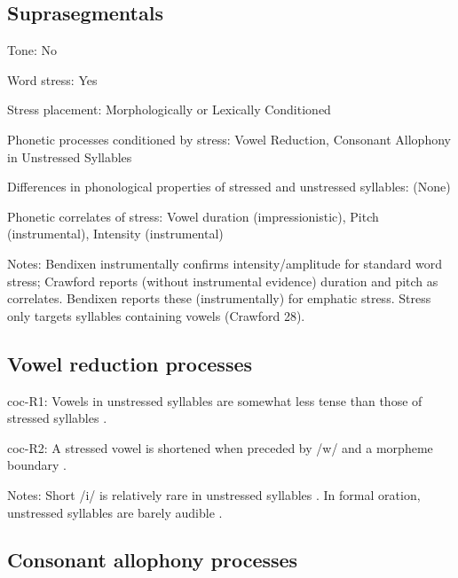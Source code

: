 {\subsection*{Suprasegmentals}
\begin{appendixdesc}
\item[Tone:] No

\item[Word stress:] Yes

\item[Stress placement:] Morphologically or Lexically Conditioned

\item[Phonetic processes conditioned by stress:] Vowel Reduction, Consonant Allophony in Unstressed Syllables

\item[Differences in phonological properties of stressed and unstressed syllables:] (None)

\item[Phonetic correlates of stress:] Vowel duration (impressionistic), Pitch (instrumental), Intensity (instrumental)

\item[Notes:] Bendixen instrumentally confirms intensity/amplitude for standard word stress; Crawford reports (without instrumental evidence) duration and pitch as correlates. Bendixen reports these (instrumentally) for emphatic stress. Stress only targets syllables containing vowels (Crawford 28).
\end{appendixdesc}
\subsection*{Vowel reduction processes}
\begin{appendixdesc}

\item[coc-R1:] Vowels in unstressed syllables are somewhat less tense than those of stressed syllables \citep[22]{Crawford1966}.

\item[coc-R2:] A stressed vowel is shortened when preceded by /w/ and a morpheme boundary \citep[67]{Bendixen1980}.

\item[Notes:] Short /i/ is relatively rare in unstressed syllables \citep[32]{Crawford1966}. In formal oration, unstressed syllables are barely audible \citep[332--333]{Bendixen1980}.
\end{appendixdesc}
\subsection*{Consonant allophony processes}
\begin{appendixdesc}


\end{appendixdesc}}
